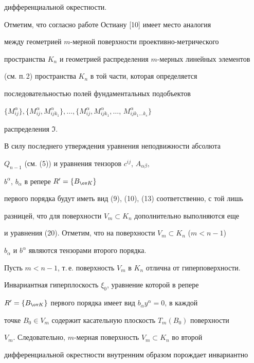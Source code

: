дифференциальной окрестности. 


 


Отметим, что согласно работе Остиану [10] имеет место аналогия 


между геометрией $m$-мер\-ной поверхности проективно-метрического 


пространства $K_n$ и геометрией распределения $m$-мер\-ных линейных элементов 


(см. п.\,2) пространства $K_n$ в той части, которая определяется 


последовательностью полей фундаментальных подобъектов 


$\{M^\alpha_{ij}\},\{M^\alpha_{ij},M^\alpha_{ijk_1}\},\dotsc, 


\{M^\alpha_{ij},M^\alpha_{ijk_1},\dotsc$, $M^\alpha_{ijk_1\dotsc k_s}\}$ 




распределения $\Im$. 


 


В силу последнего утверждения уравнения неподвижности абсолюта 


$Q_{n-1}$ (см. (5)) и уравнения тензоров $c^{ij}$, $A_{\alpha\beta}$, 


$b^\alpha$, $b_\alpha$ в репере $R'=\{B_{\ov K}\}$ 


первого порядка будут иметь вид (9), (10), (13) соответственно, с той лишь 


разницей, что для поверхности $V_m\subset K_n$ дополнительно выполняются еще 


и уравнения (20). Отметим, что на поверхности $V_m\subset K_n$ ($m<n-1$) 


$b_\alpha$ и $b^\alpha$ являются тензорами второго порядка. 


 


Пусть $m<n-1$, т.\,е. поверхность $V_m$ в $K_n$ отлична от гиперповерхности. 


Инвариантная гиперплоскость $\xi_0$, уравнение которой в репере 


$R'=\{B_{\ov K}\}$ первого порядка имеет вид $b_\alpha y^\alpha=0$, в каждой 


точке $B_0\in V_m$ содержит касательную плоскость $T_m(B_0)$ поверхности 


$V_m$. Следовательно, $m$-мерная поверхность $V_m\subset K_n$ во второй 


дифференциальной окрестности внутренним образом порождает инвариантно 


